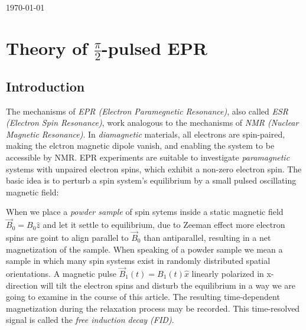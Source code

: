 \documentclass[11.5pt,a4paper]{article}
\begin{document}

\tableofcontents

\vfill
\hfill \today 


\newpage

\section{Theory of $\tfrac{\pi}{2}$-pulsed EPR}
\subsection{Introduction}
The mechanisms of \emph{EPR (Electron Paramegnetic Resonance)}, also called \emph{ESR (Electron Spin Resonance)}, work analogous to the mechanisms of \emph{NMR (Nuclear Magnetic Resonance)}. In \emph{diamagnetic} materials, all electrons are spin-paired, making the elctron magnetic dipole vanish, and enabling the system to be accessible by NMR. 
EPR experiments are suitable to investigate \emph{paramagnetic} systems with unpaired electron spins, which exhibit a non-zero electron spin. The basic idea is to perturb a spin system's equilibrium by a small pulsed oscillating magnetic field:

When we place a \emph{powder sample} of spin sytems inside a static magnetic field $\vec{B}_0 = B_0 \hat{z}$ and let it settle to equilibrium, due to Zeeman effect more electron spins are goint to align parallel to $\vec{B}_0$ than antiparallel, resulting in a net magnetization of the sample. When speaking of a powder sample we mean a sample in which many spin systems exist in randomly distributed spatial orientations. A magnetic pulse $\vec{B}_1(t) = B_1(t) \hat{x}$ linearly polarized in x-direction will tilt the electron spins and disturb the equilibrium in a way we are going to examine in the course of this article. The resulting time-dependent magnetization during the relaxation process may be recorded. This time-resolved signal is called the \emph{free induction decay (FID)}. 
\end{document}
